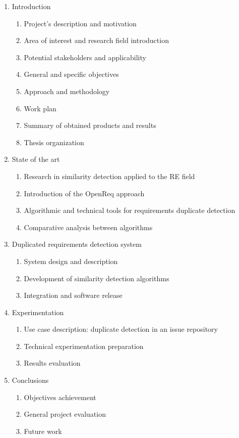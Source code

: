 \documentclass[11pt]{article}
\begin{document}
\begin{enumerate}
\item Introduction
\begin{enumerate}
\item Project's description and motivation
\item Area of interest and research field introduction
\item Potential stakeholders and applicability
\item General and specific objectives
\item Approach and methodology
\item Work plan
\item Summary of obtained products and results
\item Thesis organization
\end{enumerate}
\item State of the art
\begin{enumerate}
\item Research in similarity detection applied to the RE field
\item Introduction of the OpenReq approach
\item Algorithmic and technical tools for requirements duplicate detection
\item Comparative analysis between algorithms
\end{enumerate}
\item Duplicated requirements detection system
\begin{enumerate}
\item System design and description
\item Development of similarity detection algorithms
\item Integration and software release
\end{enumerate}
\item Experimentation
\begin{enumerate}
\item Use case description: duplicate detection in an issue repository
\item Technical experimentation preparation
\item Results evaluation
\end{enumerate}
\item Conclusions
\begin{enumerate}
\item Objectives achievement
\item General project evaluation
\item Future work
\end{enumerate}
\end{enumerate}
\end{document}
